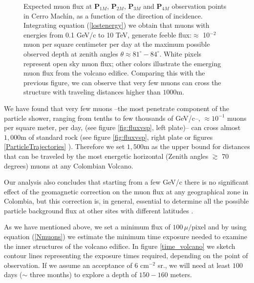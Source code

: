 \documentclass[letterpaper,10pt,titlepage,linenumber]{article}
\begin{document}
\begin{figure}[!ht]
    \caption{Expected muon flux at {\bf P$_{1M}$}, {\bf P$_{2M}$}, {\bf P$_{3M}$} and {\bf P$_{4M}$} observation points in Cerro Mach\'{\i}n, as a function of the direction of incidence. Integrating equation (\ref{lostenergy}) we obtain that muons with energies from 0.1 GeV/c to 10 TeV, generate feeble flux:$\approx$ 10$^{-2}$ muon per square centimeter per day at the maximum possible observed depth at zenith angles $\theta \approx 81^\circ-84^\circ$. White pixels represent open sky muon flux; other colors illustrate the emerging muon flux from the volcano edifice. Comparing this with the previous figure, we can observe that very few muons can cross the structure with traveling distances higher than $1000$m.}
  \label{flux_volcano}
\end{figure}

We have found that very few muons --the most penetrate component of the particle shower, ranging from tenths to few thousands of GeV/c--, $\approx10^{-1}$ muons per square meter, per day, (see figure \ref{fig:fluxvsp}, left plate)-- can cross almost $1,000$m of standard rock (see figure \ref{fig:fluxvsp}, right plate or figures \ref{ParticleTrajectories} ). Therefore we set $1,500$m as the upper bound for distances that can be traveled by the most energetic horizontal  (Zenith angles $\gtrsim$ 70 degrees) muons at any Colombian Volcano. 

Our analysis also concludes that starting from a few GeV/c there is no significant effect of the geomagnetic correction on the muon flux at any geographical zone in Colombia, but this correction is, in general, essential to determine all the possible particle background flux at other sites with different latitudes \cite{AsoreyNunezSuarez2018}.

As we have mentioned above, we set a minimum flux of $100\, \mu/$pixel and by using equation (\ref{Nmuons}) we estimate the minimum time exposure needed to examine the inner structures of the volcano edifice.  In figure \ref{time_volcano} we sketch contour lines representing the exposure times required, depending on the point of observation. If we assume an acceptance of $6$ cm$^{-2}$ sr., we will need at least $100$ days ($\sim$ three months) to explore a depth of $150-160$ meters.
\end{document}
